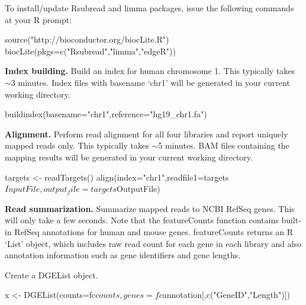 \documentclass[12pt]{report}
\newcommand{\Rsubread}{\textsf{Rsubread}}
\newcommand{\limma}{\textsf{limma}}
\newcommand{\DGEList}{\textsf{DGEList}}
\newcommand{\featureCounts}{\textsf{featureCounts}}
\newcommand{\R}{\textsf{R}}
\begin{document}
To install/update {\Rsubread} and {\limma} packages, issue the following commands at your R prompt:
\begin{Rcode}
source("http://bioconductor.org/biocLite.R")
biocLite(pkgs=c("Rsubread","limma","edgeR"))
\end{Rcode}

{\noindent\bf Index building.} Build an index for human chromosome 1. This typically takes $\sim$3 minutes. Index files with basename `chr1' will be generated in your current working directory.

\begin{Rcode}
buildindex(basename="chr1",reference="hg19_chr1.fa")
\end{Rcode}

{\noindent\bf Alignment.} Perform read alignment for all four libraries and report uniquely mapped reads only. This typically takes $\sim$5 minutes. BAM files containing the mapping results will be generated in your current working directory.

\begin{Rcode}
targets <- readTargets()
align(index="chr1",readfile1=targets$InputFile,output_file=targets$OutputFile)
\end{Rcode}

{\noindent\bf Read summarization.} Summarize mapped reads to NCBI RefSeq genes.
This will only take a few seconds.
Note that the {\featureCounts} function contains built-in RefSeq annotations for human and mouse genes.
{\featureCounts} returns an {\R} `List' object, which includes raw read count for each gene in each library and also annotation information such as gene identifiers and gene lengths.


Create a {\DGEList} object.
\begin{Rcode}
x <- DGEList(counts=fc$counts, genes=fc$annotation[,c("GeneID","Length")])
\end{Rcode}
\end{document}
